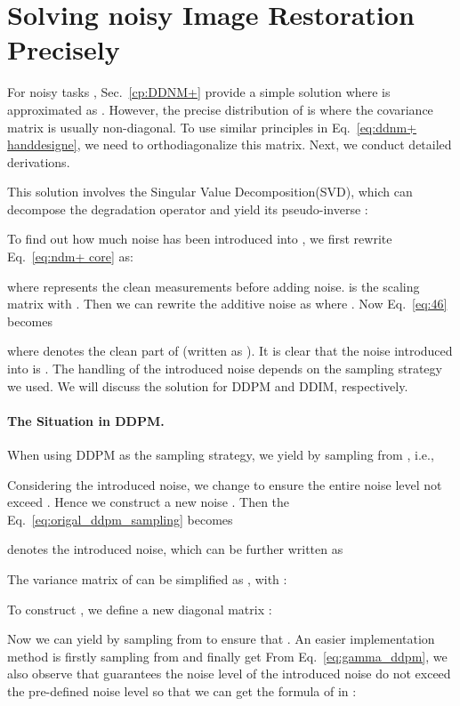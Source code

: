 \documentclass{article} \usepackage{iclr2023_conference,times}
\begin{document}
\section{Solving noisy Image Restoration Precisely}
\label{ap:ndm+}
For noisy tasks , Sec.~\ref{cp:DDNM+} provide a simple solution where  is approximated as . However, the precise distribution of  is  where the covariance matrix is usually non-diagonal. To use similar principles in Eq.~\ref{eq:ddnm+ handdesigne}, we need to 
orthodiagonalize this matrix. Next, we conduct detailed derivations.


This solution involves the Singular Value Decomposition(SVD), which can decompose the degradation operator  and yield its pseudo-inverse :



To find out how much noise has been introduced into , we first rewrite Eq.~\ref{eq:ndm+ core} as:

where  represents the clean measurements before adding noise.  is the scaling matrix with . Then we can rewrite the additive noise  as  where . Now Eq.~\ref{eq:46} becomes

where  denotes the clean part of  (written as ).
It is clear that the noise introduced into  is . The handling of the introduced noise depends on the sampling strategy we used. We will discuss the solution for DDPM and DDIM, respectively. 

\paragraph{The Situation in DDPM.}
When using DDPM as the sampling strategy, we yield  by sampling from , i.e., 

Considering the introduced noise, we change  to ensure the entire noise level not exceed . Hence we construct a new noise . Then the Eq.~\ref{eq:origal_ddpm_sampling} becomes

 denotes the introduced noise, which can be further written as

The variance matrix of  can be simplified as , with : 

To construct , we define a new diagonal matrix :

Now we can yield  by sampling from  to ensure that . An easier implementation method is firstly sampling  from  and finally get  From Eq.~\ref{eq:gamma_ddpm}, we also observe that  guarantees the noise level of the introduced noise do not exceed the pre-defined noise level  so that we can get the formula of  in :
\end{document}
